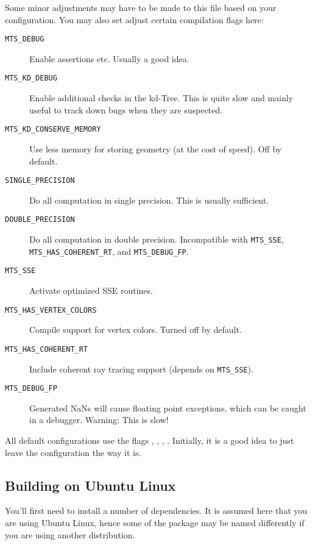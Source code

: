 Some minor adjustments may have to be made to this file based on your configuration. 
You may also set adjust certain compilation flags here:
\begin{description}
\item[\texttt{MTS\_DEBUG}] Enable assertions etc. Usually a good idea.
\item[\texttt{MTS\_KD\_DEBUG}] Enable additional checks in the kd-Tree. This
is quite slow and mainly useful to track down bugs when they are suspected.
\item[\texttt{MTS\_KD\_CONSERVE\_MEMORY}] Use less memory for storing geometry (at the cost of speed).
Off by default.
\item[\texttt{SINGLE\_PRECISION}] Do all computation in single precision. This is usually sufficient.
\item[\texttt{DOUBLE\_PRECISION}] Do all computation in double precision. Incompatible with
\texttt{MTS\_SSE}, \texttt{MTS\_HAS\_COHERENT\_RT}, and \texttt{MTS\_DEBUG\_FP}.
\item[\texttt{MTS\_SSE}]Activate optimized SSE routines.
\item[\texttt{MTS\_HAS\_VERTEX\_COLORS}]Compile support for vertex colors. Turned off by
default.
\item[\texttt{MTS\_HAS\_COHERENT\_RT}]Include coherent ray tracing support (depends on \texttt{MTS\_SSE}).
\item[\texttt{MTS\_DEBUG\_FP}]Generated NaNs will cause floating point exceptions, which can be caught in a debugger. Warning: This is slow!
\end{description}
All default configurations use the flags , , , .
Initially, it is a good idea to just leave the configuration the way it is.

\subsection{Building on Ubuntu Linux}
You'll first need to install a number of dependencies. It is assumed here
that you are using Ubuntu Linux, hence some of the package may be named differently if you are 
using another distribution.

